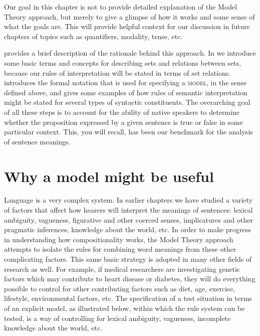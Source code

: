 Our goal in this chapter is not to provide detailed explanation of the Model Theory approach, but merely to give a glimpse of how it works and some sense of what the goals are. This will provide helpful context for our discussion in future chapters of topics such as quantifiers, modality, tense, etc.



 provides a brief description of the rationale behind this approach. In  we introduce some basic terms and concepts for describing sets and relations between sets, because our rules of interpretation will be stated in terms of set relations.  introduces the formal notation that is used for specifying a \textsc{model}, in the sense defined above, and  gives some examples of how rules of semantic interpretation might be stated for several types of syntactic constituents. The overarching goal of all these steps is to account for the ability of native speakers to determine whether the proposition expressed by a given sentence is true or false in some particular context. This, you will recall, has been our benchmark for the analysis of sentence meanings.


\section{Why a model might be useful}\label{sec:13.2}

Language is a very complex system. In earlier chapters we have studied a variety of factors that affect how hearers will interpret the meanings of sentences: lexical ambiguity, vagueness, figurative and other coerced senses, implicatures and other pragmatic inferences, knowledge about the world, etc. In order to make progress in understanding how compositionality works, the Model Theory approach attempts to isolate the rules for combining word meanings from these other complicating factors. This same basic strategy is adopted in many other fields of research as well. For example, if medical researchers are investigating genetic factors which may contribute to heart disease or diabetes, they will do everything possible to control for other contributing factors such as diet, age, exercise, lifestyle, environmental factors, etc. The specification of a test situation in terms of an explicit model, as illustrated below, within which the rule system can be tested, is a way of controlling for lexical ambiguity, vagueness, incomplete knowledge about the world, etc.



